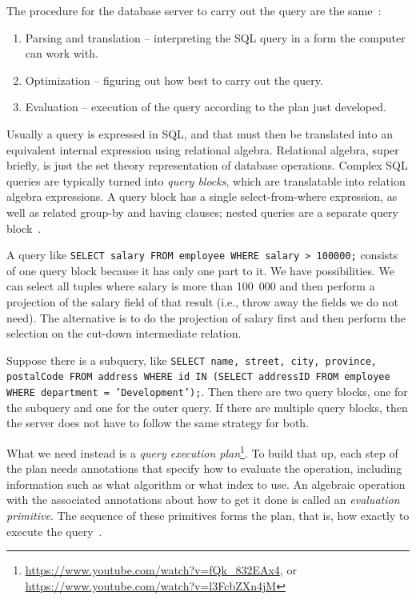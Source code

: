 \documentclass[a4paper]{report}
\begin{document}
The procedure for the database server to carry out the query are the same~\cite{dsc}:

\begin{enumerate}
	\item Parsing and translation -- interpreting the SQL query in a form the computer can work with.
	\item Optimization -- figuring out how best to carry out the query.
	\item Evaluation -- execution of the query according to the plan just developed.
\end{enumerate}

Usually a query is expressed in SQL, and that must then be translated into an equivalent internal expression using relational algebra. Relational algebra, super briefly, is just the set theory representation of database operations. Complex SQL queries are typically turned into \textit{query blocks}, which are translatable into relation algebra expressions. A query block has a single select-from-where expression, as well as related group-by and having clauses; nested queries are a separate query block~\cite{fds}.

A query like \texttt{SELECT salary FROM employee WHERE salary > 100000;} consists of one query block because it has only one part to it. We have possibilities. We can select all tuples where salary is more than 100~000 and then perform a projection of the salary field of that result (i.e., throw away the fields we do not need). The alternative is to do the projection of salary first and then perform the selection on the cut-down intermediate relation.

Suppose there is a subquery, like \texttt{SELECT name, street, city, province, postalCode FROM address WHERE id IN (SELECT addressID FROM employee WHERE department = 'Development');}. Then there are two query blocks, one for the subquery and one for the outer query. If there are multiple query blocks, then the server does not have to follow the same strategy for both.

What we need instead is a \textit{query execution plan}\footnote{\url{https://www.youtube.com/watch?v=fQk_832EAx4}, or \url{https://www.youtube.com/watch?v=l3FcbZXn4jM}}. To build that up, each step of the plan needs annotations that specify how to evaluate the operation, including information such as what algorithm or what index to use. An algebraic operation with the associated annotations about how to get it done is called an \textit{evaluation primitive}. The sequence of these primitives forms the plan, that is, how exactly to execute the query~\cite{dsc}. 
\end{document}
